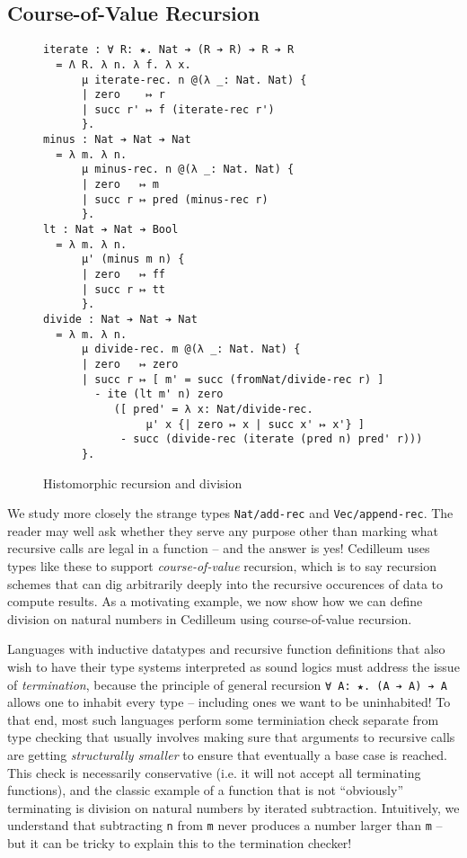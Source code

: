 \documentclass{article}
\begin{document}
\subsection{Course-of-Value Recursion}
\label{sec:hist-rec}
\begin{figure}[h]
\begin{verbatim}
iterate : ∀ R: ★. Nat ➔ (R ➔ R) ➔ R ➔ R
  = Λ R. λ n. λ f. λ x.
      μ iterate-rec. n @(λ _: Nat. Nat) {
      | zero    ↦ r
      | succ r' ↦ f (iterate-rec r') 
      }.
minus : Nat ➔ Nat ➔ Nat
  = λ m. λ n.
      μ minus-rec. n @(λ _: Nat. Nat) {
      | zero   ↦ m
      | succ r ↦ pred (minus-rec r)
      }.
lt : Nat ➔ Nat ➔ Bool
  = λ m. λ n.
      μ' (minus m n) {
      | zero   ↦ ff
      | succ r ↦ tt
      }.
divide : Nat ➔ Nat ➔ Nat
  = λ m. λ n.
      μ divide-rec. m @(λ _: Nat. Nat) {
      | zero   ↦ zero
      | succ r ↦ [ m' = succ (fromNat/divide-rec r) ]
        - ite (lt m' n) zero
           ([ pred' = λ x: Nat/divide-rec.
                μ' x {| zero ↦ x | succ x' ↦ x'} ]
            - succ (divide-rec (iterate (pred n) pred' r)))
      }.
\end{verbatim}
  \caption{Histomorphic recursion and division}
  \label{fig:ex-data-div}
\end{figure}
We study more closely the strange types \verb;Nat/add-rec; and
\verb;Vec/append-rec;. The reader may well ask whether they serve any purpose
other than marking what recursive calls are legal in a function -- and the
answer is yes! Cedilleum uses types like these to support
\textit{course-of-value} recursion, which is to say recursion schemes that can
dig arbitrarily deeply into the recursive occurences of data to compute results.
As a motivating example, we now show how we can define division on natural
numbers in Cedilleum using course-of-value recursion.

Languages with inductive datatypes and recursive function definitions that also
wish to have their type systems interpreted as sound logics must address the
issue of \textit{termination}, because the principle of general recursion
\verb;∀ A: ★. (A ➔ A) ➔ A; allows one to inhabit every type -- including ones we
want to be uninhabited! To that end, most such languages perform some
terminiation check separate from type checking that usually involves making sure
that arguments to recursive calls are getting \textit{structurally smaller} to
ensure that eventually a base case is reached. This check is necessarily
conservative (i.e. it will not accept all terminating functions), and the
classic example of a function that is not ``obviously'' terminating is division
on natural numbers by iterated subtraction. Intuitively, we understand that
subtracting \texttt{n} from \texttt{m} never produces a number larger than
\texttt{m} -- but it can be tricky to explain this to the termination checker!
\end{document}
